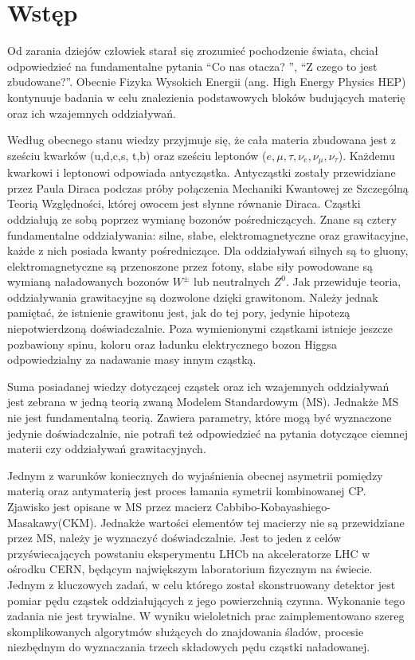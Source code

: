 \chapter*{Wstęp}

Od zarania dziejów człowiek starał się zrozumieć pochodzenie świata, chciał odpowiedzieć na fundamentalne pytania ``Co nas otacza? '', ``Z czego to jest zbudowane?''. Obecnie Fizyka Wysokich Energii (ang. High Energy Physics HEP) kontynuuje badania w celu znalezienia podstawowych bloków budujących materię oraz ich wzajemnych oddziaływań.

Według obecnego stanu wiedzy przyjmuje się, że cała materia zbudowana jest z sześciu kwarków (u,d,c,s, t,b) oraz sześciu leptonów ($e, \mu, \tau, \nu_e,\nu_{\mu},\nu_{\tau}$). Każdemu kwarkowi i leptonowi odpowiada antycząstka. Antycząstki zostały przewidziane przez Paula Diraca podczas próby połączenia Mechaniki Kwantowej ze Szczególną Teorią Względności, której owocem jest słynne równanie Diraca. Cząstki oddziałują ze sobą poprzez wymianę bozonów pośredniczących. Znane są cztery fundamentalne oddziaływania: silne, słabe, elektromagnetyczne oraz grawitacyjne, każde z nich posiada kwanty pośredniczące. Dla oddziaływań silnych są to gluony, elektromagnetyczne są przenoszone przez fotony, słabe siły powodowane są wymianą naładowanych bozonów $W^{\pm}$ lub neutralnych $Z^{0}$. Jak przewiduje teoria, oddziaływania grawitacyjne są dozwolone dzięki grawitonom. Należy jednak pamiętać, że istnienie grawitonu jest, jak do tej pory, jedynie hipotezą niepotwierdzoną doświadczalnie. Poza wymienionymi cząstkami istnieje jeszcze pozbawiony spinu, koloru oraz ładunku elektrycznego bozon Higgsa odpowiedzialny za nadawanie masy innym cząstką.

Suma posiadanej wiedzy dotyczącej cząstek oraz ich wzajemnych oddziaływań jest zebrana w jedną teorią zwaną Modelem Standardowym (MS). Jednakże MS nie jest fundamentalną teorią. Zawiera parametry, które mogą być wyznaczone jedynie doświadczalnie, nie potrafi też odpowiedzieć na pytania dotyczące ciemnej materii czy oddziaływań grawitacyjnych.

Jednym z warunków koniecznych do wyjaśnienia obecnej asymetrii pomiędzy materią oraz antymaterią jest proces łamania symetrii kombinowanej CP. Zjawisko jest opisane w MS przez macierz Cabbibo-Kobayashiego-Masakawy(CKM). Jednakże wartości elementów tej macierzy nie są przewidziane przez MS, należy je wyznaczyć doświadczalnie. 
Jest to jeden z celów przyświecających powstaniu eksperymentu LHCb na akceleratorze LHC w ośrodku CERN, będącym największym laboratorium fizycznym na świecie. Jednym z kluczowych zadań, w celu którego został skonstruowany detektor jest pomiar pędu cząstek oddziałujących z jego powierzchnią czynna. Wykonanie tego zadania nie jest trywialne. W wyniku wieloletnich prac zaimplementowano szereg skomplikowanych algorytmów służących do znajdowania śladów, procesie niezbędnym do wyznaczania trzech składowych pędu cząstki naładowanej. 

